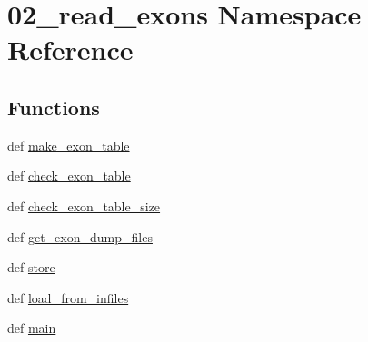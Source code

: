 \hypertarget{namespace02__read__exons}{\section{02\-\_\-read\-\_\-exons Namespace Reference}
\label{namespace02__read__exons}
}
\subsection*{Functions}
\begin{DoxyCompactItemize}
\item 
def \hyperlink{namespace02__read__exons_a15720be202cb298ea6cab1aa8e70d0ca}{make\-\_\-exon\-\_\-table}
\item 
def \hyperlink{namespace02__read__exons_a0b958b1dd2129e8f0a1f1472744766df}{check\-\_\-exon\-\_\-table}
\item 
def \hyperlink{namespace02__read__exons_af40eeeb6af3dc2ee4e02ec798256fefc}{check\-\_\-exon\-\_\-table\-\_\-size}
\item 
def \hyperlink{namespace02__read__exons_aa6088e9f00a27e242ff4aa086fd99b5a}{get\-\_\-exon\-\_\-dump\-\_\-files}
\item 
def \hyperlink{namespace02__read__exons_a2979848b8b41cf94dc90fedd40345350}{store}
\item 
def \hyperlink{namespace02__read__exons_ac4ef27ee5d36478e7b32beeace171e36}{load\-\_\-from\-\_\-infiles}
\item 
def \hyperlink{namespace02__read__exons_a18f7b03488d248de294cb85fa2f965fe}{main}
\end{DoxyCompactItemize}



